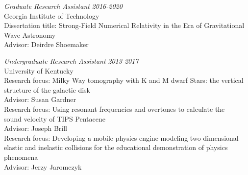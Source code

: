 \documentclass[11pt]{article}
\begin{document}
\begin{flushleft}
 \vspace{8px}  
  
  \textit{Graduate Research Assistant} \hfill \textit{2016-2020}\\
  Georgia Institute of Technology\\
  Dissertation title: Strong-Field Numerical Relativity in the Era of Gravitational\\ Wave Astronomy\\
  Advisor: Deirdre Shoemaker\\
  
  \vspace{8px}
	
  \textit{Undergraduate Research Assistant} \hfill \textit{2013-2017}\\
  University of Kentucky\\
  Research focus: Milky Way tomography with K and M dwarf Stars: the vertical\\ structure of the galactic disk\\ 
  Advisor: Susan Gardner\\
  \vspace{2px}
  Research focus: Using resonant frequencies and overtones to calculate the\\ sound velocity of TIPS Pentacene\\
  Advisor: Joseph Brill\\
  \vspace{2px}
  Research focus: Developing a mobile physics engine modeling two dimensional\\ elastic and inelastic collisions for the educational demonstration of physics phenomena\\
  Advisor: Jerzy Jaromczyk\\
  
  \vspace{8px}
	

\end{flushleft}
\end{document}
